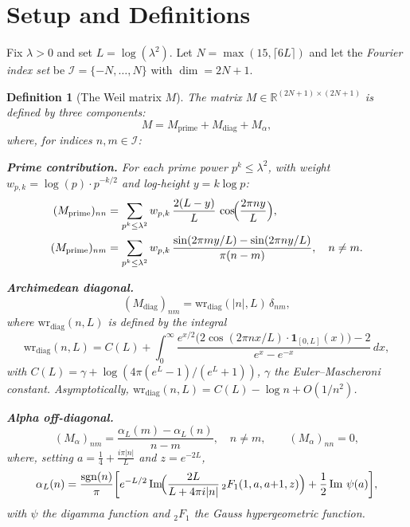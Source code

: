 \documentclass[11pt,a4paper]{article}
\newtheorem{definition}{Definition}[section]
\DeclareMathOperator{\sgn}{sgn}
\begin{document}
\section{Setup and Definitions}\label{sec:setup}

Fix $\lambda > 0$ and set $L = \log(\lambda^2)$. Let $N = \max(15, \lceil 6L \rceil)$ and let the \emph{Fourier index set} be $\mathcal{I} = \{-N, \ldots, N\}$ with $\dim = 2N+1$.

\begin{definition}[The Weil matrix $M$]\label{def:M}
The matrix $M \in \mathbb{R}^{(2N+1) \times (2N+1)}$ is defined by three components:
\begin{equation}\label{eq:M}
M = M_{\mathrm{prime}} + M_{\mathrm{diag}} + M_{\alpha},
\end{equation}
where, for indices $n, m \in \mathcal{I}$:

\medskip\noindent\textbf{Prime contribution.} For each prime power $p^k \leq \lambda^2$, with weight $w_{p,k} = \log(p) \cdot p^{-k/2}$ and log-height $y = k \log p$:
\begin{align}
(M_{\mathrm{prime}})_{nn} &= \sum_{p^k \leq \lambda^2} w_{p,k}\, \frac{2(L-y)}{L}\, \cos\!\Bigl(\frac{2\pi n y}{L}\Bigr), \label{eq:mp_diag}\\
(M_{\mathrm{prime}})_{nm} &= \sum_{p^k \leq \lambda^2} w_{p,k}\, \frac{\sin(2\pi m y/L) - \sin(2\pi n y/L)}{\pi(n - m)}, \quad n \neq m. \label{eq:mp_off}
\end{align}

\medskip\noindent\textbf{Archimedean diagonal.}
\begin{equation}\label{eq:mdiag}
(M_{\mathrm{diag}})_{nm} = \mathrm{wr}_{\mathrm{diag}}(|n|, L)\, \delta_{nm},
\end{equation}
where $\mathrm{wr}_{\mathrm{diag}}(n, L)$ is defined by the integral
\[
\mathrm{wr}_{\mathrm{diag}}(n, L) = C(L) + \int_0^\infty \frac{e^{x/2}\bigl(2\cos(2\pi n x/L)\cdot\mathbf{1}_{[0,L]}(x)\bigr) - 2}{e^x - e^{-x}}\,dx,
\]
with $C(L) = \gamma + \log(4\pi(e^L - 1)/(e^L + 1))$, $\gamma$ the Euler--Mascheroni constant. Asymptotically, $\mathrm{wr}_{\mathrm{diag}}(n, L) = C(L) - \log n + O(1/n^2)$.

\medskip\noindent\textbf{Alpha off-diagonal.}
\begin{equation}\label{eq:malpha}
(M_{\alpha})_{nm} = \frac{\alpha_L(m) - \alpha_L(n)}{n - m}, \quad n \neq m, \qquad (M_{\alpha})_{nn} = 0,
\end{equation}
where, setting $a = \tfrac{1}{4} + \tfrac{i\pi|n|}{L}$ and $z = e^{-2L}$,
\[
\alpha_L(n) = \frac{\sgn(n)}{\pi}\biggl[e^{-L/2}\operatorname{Im}\!\Bigl(\frac{2L}{L + 4\pi i|n|}\,{}_2F_1(1, a, a{+}1, z)\Bigr) + \frac{1}{2}\operatorname{Im}\,\psi(a)\biggr],
\]
with $\psi$ the digamma function and ${}_2F_1$ the Gauss hypergeometric function.
\end{definition}
\end{document}
